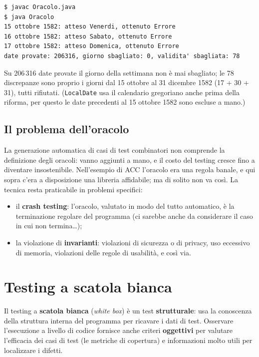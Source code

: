 \begin{lstlisting}[style=shell, name=Terminale, deletekeywords={java}, deletestring={[b]'}]
$ javac Oracolo.java
$ java Oracolo
15 ottobre 1582: atteso Venerdi, ottenuto Errore
16 ottobre 1582: atteso Sabato, ottenuto Errore
17 ottobre 1582: atteso Domenica, ottenuto Errore
date provate: 206316, giorno sbagliato: 0, validita' sbagliata: 78
\end{lstlisting}

Su 206\,316 date provate il giorno della settimana non è mai sbagliato; le 78 discrepanze sono proprio i giorni dal 15
ottobre al 31 dicembre 1582 (17 + 30 + 31), tutti rifiutati. (\texttt{LocalDate} usa il calendario gregoriano anche
prima della riforma, per questo le date precedenti al 15 ottobre 1582 sono escluse a mano.)

\subsection{Il problema dell'oracolo}

La generazione automatica di casi di test combinatori non comprende la definizione degli oracoli: vanno aggiunti a mano,
e il costo del testing cresce fino a diventare insostenibile. Nell'esempio di ACC l'oracolo era una regola banale, e qui
sopra c'era a disposizione una libreria affidabile; ma di solito non va così. La tecnica resta praticabile in problemi
specifici:

\begin{itemize}
  \item il \textbf{crash testing}: l'oracolo, valutato in modo del tutto automatico, è la terminazione regolare del
        programma (ci sarebbe anche da considerare il caso in cui non termina\ldots);
  \item la violazione di \textbf{invarianti}: violazioni di sicurezza o di privacy, uso eccessivo di memoria, violazioni
        delle regole di usabilità, e così via.
\end{itemize}

\section{Testing a scatola bianca}

Il testing a \textbf{scatola bianca} (\textit{white box}) è un test \textbf{strutturale}: usa la conoscenza della
struttura interna del programma per ricavare i dati di test. Osservare l'esecuzione a livello di codice fornisce anche
criteri \textbf{oggettivi} per valutare l'efficacia dei casi di test (le metriche di copertura) e informazioni molto
utili per localizzare i difetti.

